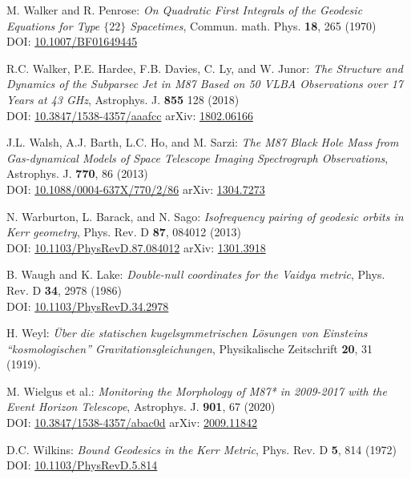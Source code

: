 \begin{thebibliography}{123}
M. Walker and R. Penrose: {\em On Quadratic First Integrals of the Geodesic Equations
for Type $\{22\}$ Spacetimes},
Commun. math. Phys. {\bf 18}, 265 (1970)\\
DOI: \href{https://doi.org/10.1007/BF01649445}{10.1007/BF01649445}

R.C. Walker, P.E. Hardee, F.B. Davies, C. Ly, and W. Junor:
{\em The Structure and Dynamics of the Subparsec Jet in M87 Based on 50 VLBA Observations over 17 Years at 43 GHz},
Astrophys. J. {\bf 855} 128 (2018)\\
DOI: \href{https://doi.org/10.3847/1538-4357/aaafcc}{10.3847/1538-4357/aaafcc}\hfill
arXiv: \href{https://arxiv.org/abs/1802.06166}{1802.06166}

J.L. Walsh, A.J. Barth, L.C. Ho, and M. Sarzi:
{\em The M87 Black Hole Mass from Gas-dynamical Models of Space Telescope Imaging Spectrograph Observations},
Astrophys. J. {\bf 770}, 86 (2013)\\
DOI: \href{https://doi.org/10.1088/0004-637X/770/2/86}{10.1088/0004-637X/770/2/86}\hfill
arXiv: \href{https://arxiv.org/abs/1304.7273}{1304.7273}

N. Warburton, L. Barack, and N. Sago:
{\em Isofrequency pairing of geodesic orbits in Kerr geometry},
Phys. Rev. D {\bf 87}, 084012 (2013)\\
DOI: \href{https://doi.org/10.1103/PhysRevD.87.084012}{10.1103/PhysRevD.87.084012}\hfill
arXiv: \href{https://arxiv.org/abs/1301.3918}{1301.3918}

B. Waugh and K. Lake:
{\em Double-null coordinates for the Vaidya metric},
Phys. Rev. D {\bf 34}, 2978 (1986)\\
DOI: \href{https://doi.org/10.1103/PhysRevD.34.2978}{10.1103/PhysRevD.34.2978}

H. Weyl: {\em \"Uber die statischen kugelsymmetrischen L\"osungen von Einsteins ``kosmologischen'' Gravitationsgleichungen},
Physikalische Zeitschrift {\bf 20}, 31 (1919).

M. Wielgus et al.:
{\em Monitoring the Morphology of M87* in 2009-2017 with the Event Horizon Telescope},
Astrophys. J. {\bf 901}, 67 (2020)\\
DOI: \href{https://doi.org/10.3847/1538-4357/abac0d}{10.3847/1538-4357/abac0d}\hfill
arXiv: \href{https://arxiv.org/abs/2009.11842}{2009.11842}

D.C. Wilkins:
{\em Bound Geodesics in the Kerr Metric},
Phys. Rev. D {\bf 5}, 814 (1972)\\
DOI: \href{https://doi.org/10.1103/PhysRevD.5.814}{10.1103/PhysRevD.5.814}


\end{thebibliography}
